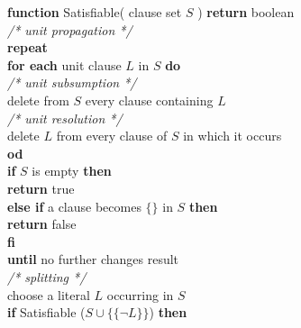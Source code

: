 \begin{listing}[ht]
  \textbf{function} Satisfiable( clause set $S$ ) \textbf{return} boolean\\
    \hspace*{0.5cm}
    \textit{/* unit propagation */}\\
    \hspace*{0.5cm}
    \textbf{repeat}\\
      \hspace*{1.0cm}
      \textbf{for each} unit clause $L$ in $S$ \textbf{do}\\
        \hspace*{1.5cm}
        \textit{/* unit subsumption */}\\
        \hspace*{1.5cm}
        delete from $S$ every clause containing $L$\\
        \hspace*{1.5cm}
        \textit{/* unit resolution */}\\
        \hspace*{1.5cm}
        delete $L$ from every clause of $S$ in which it occurs\\
      \hspace*{1.0cm}
      \textbf{od}\\
      \hspace*{1.0cm}
      \textbf{if} $S$ is empty \textbf{then}\\
        \hspace*{1.5cm}
        \textbf{return} true\\
      \hspace*{1.0cm}
      \textbf{else if} a clause becomes $\{\}$ in $S$ \textbf{then}\\
        \hspace*{1.5cm}
        \textbf{return} false\\
      \hspace*{1.0cm}
      \textbf{fi}\\
    \hspace*{0.5cm}
    \textbf{until} no further changes result\\
    \hspace*{0.5cm}
    \textit{/* splitting */}\\
    \hspace*{0.5cm}
    choose a literal $L$ occurring in $S$\\
    \hspace*{0.5cm}
    \textbf{if} Satisfiable ($S \cup \{\{\neg L\}\}$) \textbf{then}\\

\end{listing}
